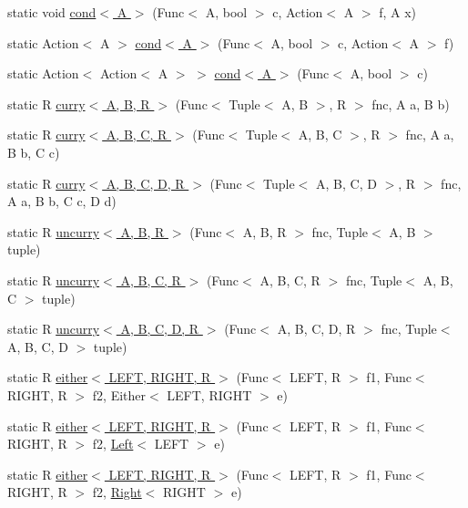 \begin{DoxyCompactItemize}
\item 
static void \hyperlink{class_prelude_ac8759889261ebec113607db06e3e8b36}{cond$<$ A $>$} (Func$<$ A, bool $>$ c, Action$<$ A $>$ f, A x)
\item 
static Action$<$ A $>$ \hyperlink{class_prelude_a7e8f698ae49306ade569f7356d6f9b00}{cond$<$ A $>$} (Func$<$ A, bool $>$ c, Action$<$ A $>$ f)
\item 
static Action$<$ Action$<$ A $>$ $>$ \hyperlink{class_prelude_aa00ff8e5ef72104529f326ff03291e73}{cond$<$ A $>$} (Func$<$ A, bool $>$ c)
\item 
static R \hyperlink{class_prelude_a24814d177e03dc810bc4bfb4d695bd80}{curry$<$ A, B, R $>$} (Func$<$ Tuple$<$ A, B $>$, R $>$ fnc, A a, B b)
\item 
static R \hyperlink{class_prelude_a860670c76455ffc8a48058ea5352434a}{curry$<$ A, B, C, R $>$} (Func$<$ Tuple$<$ A, B, C $>$, R $>$ fnc, A a, B b, C c)
\item 
static R \hyperlink{class_prelude_a7c28a5c366f32c99be6250c0216f57b8}{curry$<$ A, B, C, D, R $>$} (Func$<$ Tuple$<$ A, B, C, D $>$, R $>$ fnc, A a, B b, C c, D d)
\item 
static R \hyperlink{class_prelude_a5080bd1a39bb10367cd34840ce3adddd}{uncurry$<$ A, B, R $>$} (Func$<$ A, B, R $>$ fnc, Tuple$<$ A, B $>$ tuple)
\item 
static R \hyperlink{class_prelude_a086f4b975de7260ca19d56631b5d57cb}{uncurry$<$ A, B, C, R $>$} (Func$<$ A, B, C, R $>$ fnc, Tuple$<$ A, B, C $>$ tuple)
\item 
static R \hyperlink{class_prelude_a37084c8721ec532cb50604bca2163906}{uncurry$<$ A, B, C, D, R $>$} (Func$<$ A, B, C, D, R $>$ fnc, Tuple$<$ A, B, C, D $>$ tuple)
\item 
static R \hyperlink{class_prelude_aa5a10dae8e1775de4e88016e3e6a0ccb}{either$<$ L\+E\+F\+T, R\+I\+G\+H\+T, R $>$} (Func$<$ L\+E\+F\+T, R $>$ f1, Func$<$ R\+I\+G\+H\+T, R $>$ f2, Either$<$ L\+E\+F\+T, R\+I\+G\+H\+T $>$ e)
\item 
static R \hyperlink{class_prelude_aae19c7cdea0497eca0a2c1a5fab81277}{either$<$ L\+E\+F\+T, R\+I\+G\+H\+T, R $>$} (Func$<$ L\+E\+F\+T, R $>$ f1, Func$<$ R\+I\+G\+H\+T, R $>$ f2, \hyperlink{i_c_s___edge_enum_8cs_af0c43d9550817659c245d5d49fbb4771a945d5e233cf7d6240f6b783b36a374ff}{Left}$<$ L\+E\+F\+T $>$ e)
\item 
static R \hyperlink{class_prelude_aae701859034dc5e543bfe576976054b3}{either$<$ L\+E\+F\+T, R\+I\+G\+H\+T, R $>$} (Func$<$ L\+E\+F\+T, R $>$ f1, Func$<$ R\+I\+G\+H\+T, R $>$ f2, \hyperlink{i_c_s___edge_enum_8cs_af0c43d9550817659c245d5d49fbb4771a92b09c7c48c520c3c55e497875da437c}{Right}$<$ R\+I\+G\+H\+T $>$ e)

\end{DoxyCompactItemize}
